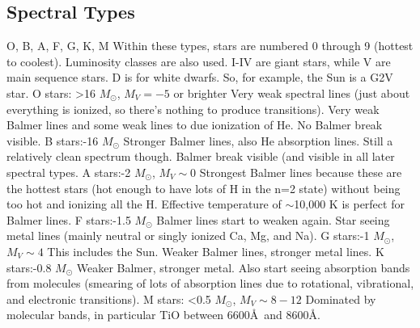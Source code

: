 \subsection{Spectral Types}
O, B, A, F, G, K, M\newline
Within these types, stars are numbered 0 through 9 (hottest to coolest).  Luminosity classes 
are also used.  I-IV are giant stars, while V are main sequence stars.  D is for white dwarfs.  
So, for example, the Sun is a G2V star.\newline
O stars:\newline
>16 $M_{\odot}$, $M_V=-5$ or brighter\newline
Very weak spectral lines (just about everything is ionized, so there's nothing 
to produce transitions).  Very weak Balmer lines and some weak lines to due 
ionization of He.  No Balmer break visible.\newline
B stars:-16 $M_{\odot}$\newline
Stronger Balmer lines, also He absorption lines.  Still a relatively clean 
spectrum though.  Balmer break visible (and visible in all later spectral 
types.\newline
A stars:-2 $M_{\odot}$, $M_V\sim 0$\newline
Strongest Balmer lines because these are the hottest stars (hot enough to have 
lots of H in the n=2 state) without being too hot and ionizing all the H.  
Effective temperature of $\sim$10,000 K is perfect for Balmer lines.\newline
F stars:-1.5 $M_{\odot}$\newline
Balmer lines start to weaken again.  Star seeing metal lines (mainly neutral 
or singly ionized Ca, Mg, and Na).\newline
G stars:-1 $M_{\odot}$, $M_V\sim4$\newline
This includes the Sun.  Weaker Balmer lines, stronger metal lines.\newline
K stars:-0.8 $M_{\odot}$\newline
Weaker Balmer, stronger metal.  Also start seeing absorption bands from 
molecules (smearing of lots of absorption lines due to rotational, vibrational, 
and electronic transitions).
M stars:\newline
<0.5 $M_{\odot}$, $M_V\sim 8-12$\newline
Dominated by molecular bands, in particular TiO between 6600\AA\ and 8600\AA.


